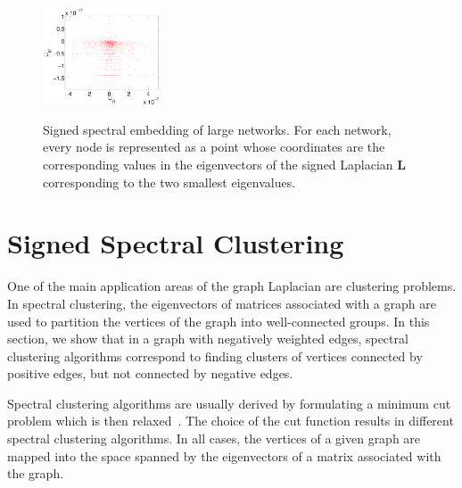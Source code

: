 \documentclass[11pt,a4paper]{book}
\newcommand{\wThree}{0.31}
\begin{document}
\begin{figure}[h!]
{    \includegraphics[width=\wThree\textwidth]{img-st/map.elec.lu}}
  \caption{
    Signed spectral embedding of large networks.  For each network, every
    node is represented as a point whose coordinates are the
    corresponding values in the eigenvectors of the signed Laplacian
    $\mathbf L$ corresponding to the two smallest eigenvalues. 
  }
  \label{fig:large}
\end{figure}

\section{Signed Spectral Clustering}
\label{sec:signed:clustering}
One of the main application areas of the graph Laplacian are clustering problems.
In spectral clustering, the eigenvectors of matrices associated with a
graph are used to partition the vertices of the graph into
well-connected groups.  In this section, we show that in a graph with
negatively weighted edges, spectral clustering algorithms correspond to
finding clusters of vertices connected by positive edges, but not
connected by negative edges. 

Spectral clustering algorithms are usually derived by formulating a
minimum cut problem which is then
relaxed~\cite{b148,b246,b304,b452,b453}.  The choice of the cut 
function results in different spectral clustering algorithms.  In all
cases, the vertices of a given graph are mapped into the space spanned
by the eigenvectors of a matrix associated with the graph. 
\end{document}
